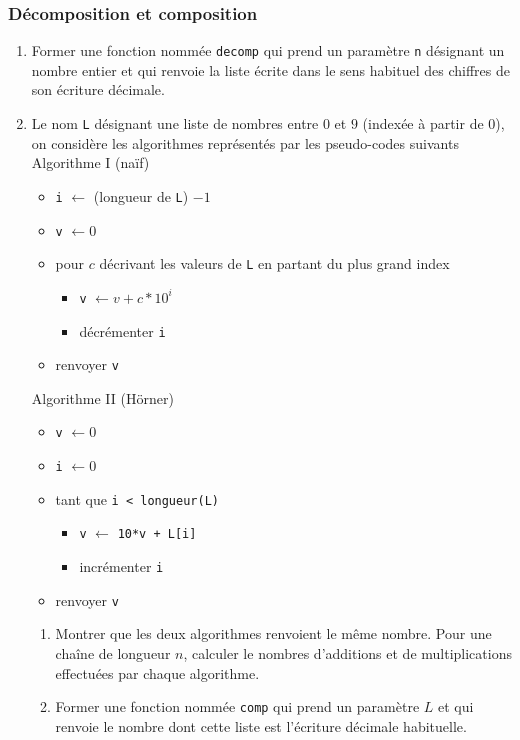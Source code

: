 \subsubsection{Décomposition et composition}
\begin{enumerate}
  \item Former une fonction nommée \verb|decomp| qui prend un paramètre \verb|n| désignant un nombre entier et qui renvoie la liste écrite dans le sens habituel des chiffres de son écriture décimale.
  \item Le nom \verb|L| désignant une liste de nombres entre $0$ et $9$ (indexée à partir de $0$), on considère les algorithmes représentés par les pseudo-codes suivants \newline
Algorithme I (naïf)
  \begin{itemize}
    \item \verb|i| $\longleftarrow$ (longueur de \verb|L|) $-1$
    \item \verb|v| $\longleftarrow 0$
    \item pour $c$ décrivant les valeurs de \verb|L| en partant du plus grand index
    \begin{itemize}
      \item \verb|v| $\longleftarrow v + c* 10^i$
      \item décrémenter \verb|i|
    \end{itemize}
    \item renvoyer \verb|v|
  \end{itemize}
Algorithme II (Hörner)
\begin{itemize}
  \item \verb|v| $\longleftarrow 0$
  \item \verb|i| $\longleftarrow 0$
  \item tant que \verb|i < longueur(L)|
  \begin{itemize}
    \item \verb|v| $\longleftarrow$ \verb|10*v + L[i]|
    \item incrémenter \verb|i|
  \end{itemize}
  \item renvoyer \verb|v|
\end{itemize}
\begin{enumerate}
  \item Montrer que les deux algorithmes renvoient le même nombre. Pour une chaîne de longueur $n$, calculer le nombres d'additions et de multiplications effectuées par chaque algorithme.
  \item Former une fonction nommée \verb|comp| qui prend un paramètre $L$ et qui renvoie le nombre dont cette liste est l'écriture décimale habituelle. 
\end{enumerate}
\end{enumerate}

